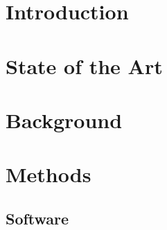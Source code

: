 \documentclass  [
paper    = a4,
BCOR     = 10mm,
twoside,
fontsize = 12pt,
toc      = bibnumbered,
toc      = listofnumbered,
numbers  = noendperiod,
headings = normal,
listof   = leveldown,
version  = 3.03
]                                       {scrreprt}
\begin{document}
	
	
	\tableofcontents
	
	\chapter{Introduction}
	
	\chapter{State of the Art}
	\label{sec::2_sota}
	
	\chapter{Background}
	
	
	\chapter{Methods}
	\section{Software}
	
\end{document}

